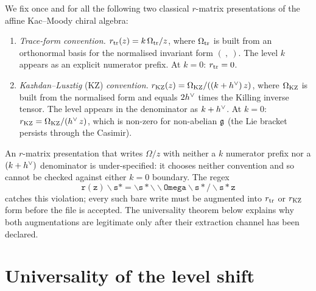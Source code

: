 \begin{definition}
\label{def:rmatrix-convention}
We fix once and for all the following two classical $r$-matrix
presentations of the affine Kac--Moody chiral algebra:
\begin{enumerate}
 \item \emph{Trace-form convention.} $r_{\mathrm{tr}}(z) = k\,\Omega_{\mathrm{tr}} / z$,
 where $\Omega_{\mathrm{tr}}$ is built from an orthonormal basis for the
 normalised invariant form $(\ ,\ )$. The level $k$ appears as an
 explicit numerator prefix. At $k = 0$: $r_{\mathrm{tr}} = 0$.
 \item \emph{Kazhdan--Lusztig} (KZ) \emph{convention.}
 $r_{\mathrm{KZ}}(z) = \Omega_{\mathrm{KZ}} / ((k + h^{\vee})\,z)$, where $\Omega_{\mathrm{KZ}}$ is built
 from the normalised form and equals $2h^{\vee}$ times the Killing
 inverse tensor. The level appears in the denominator as
 $k + h^{\vee}$. At $k = 0$:
 $r_{\mathrm{KZ}} = \Omega_{\mathrm{KZ}} / (h^{\vee}\,z)$, which is non-zero for non-abelian
 $\mathfrak{g}$ (the Lie bracket persists through the Casimir).
\end{enumerate}
\end{definition}

\begin{remark}
\label{rem:level-shift-universal}
An $r$-matrix presentation that writes $\Omega / z$ with neither a $k$
numerator prefix nor a $(k + h^{\vee})$ denominator is under-specified: it
chooses neither convention and so cannot be checked against either
$k = 0$ boundary. The regex
\[
 \mathtt{r(z)\backslash s*=\backslash s*\backslash\backslash Omega\backslash s*/\backslash s*z}
\]
catches this violation; every such bare write must be augmented into
$r_{\mathrm{tr}}$ or $r_{\mathrm{KZ}}$ form before the file is accepted. The universality
theorem below explains why both augmentations are legitimate only after
their extraction channel has been declared.
\end{remark}

\section{Universality of the level shift}
\label{sec:universality}

